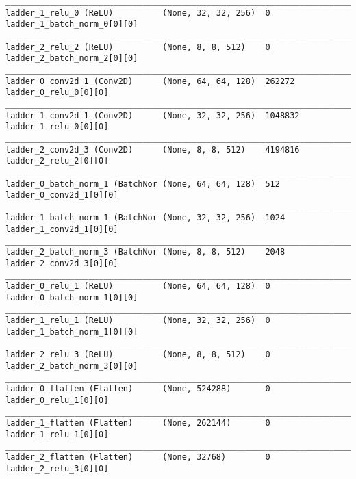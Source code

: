 \begin{lstlisting}[caption={CelebA-\ac{VLAE}-\ac{GAN} Encoder},captionpos=b,basicstyle=\tiny, label={lst:mnist-vlae-gan-encoder}]
__________________________________________________________________________________________________
ladder_1_relu_0 (ReLU)          (None, 32, 32, 256)  0           ladder_1_batch_norm_0[0][0]
__________________________________________________________________________________________________
ladder_2_relu_2 (ReLU)          (None, 8, 8, 512)    0           ladder_2_batch_norm_2[0][0]
__________________________________________________________________________________________________
ladder_0_conv2d_1 (Conv2D)      (None, 64, 64, 128)  262272      ladder_0_relu_0[0][0]
__________________________________________________________________________________________________
ladder_1_conv2d_1 (Conv2D)      (None, 32, 32, 256)  1048832     ladder_1_relu_0[0][0]
__________________________________________________________________________________________________
ladder_2_conv2d_3 (Conv2D)      (None, 8, 8, 512)    4194816     ladder_2_relu_2[0][0]
__________________________________________________________________________________________________
ladder_0_batch_norm_1 (BatchNor (None, 64, 64, 128)  512         ladder_0_conv2d_1[0][0]
__________________________________________________________________________________________________
ladder_1_batch_norm_1 (BatchNor (None, 32, 32, 256)  1024        ladder_1_conv2d_1[0][0]
__________________________________________________________________________________________________
ladder_2_batch_norm_3 (BatchNor (None, 8, 8, 512)    2048        ladder_2_conv2d_3[0][0]
__________________________________________________________________________________________________
ladder_0_relu_1 (ReLU)          (None, 64, 64, 128)  0           ladder_0_batch_norm_1[0][0]
__________________________________________________________________________________________________
ladder_1_relu_1 (ReLU)          (None, 32, 32, 256)  0           ladder_1_batch_norm_1[0][0]
__________________________________________________________________________________________________
ladder_2_relu_3 (ReLU)          (None, 8, 8, 512)    0           ladder_2_batch_norm_3[0][0]
__________________________________________________________________________________________________
ladder_0_flatten (Flatten)      (None, 524288)       0           ladder_0_relu_1[0][0]
__________________________________________________________________________________________________
ladder_1_flatten (Flatten)      (None, 262144)       0           ladder_1_relu_1[0][0]
__________________________________________________________________________________________________
ladder_2_flatten (Flatten)      (None, 32768)        0           ladder_2_relu_3[0][0]

\end{lstlisting}
